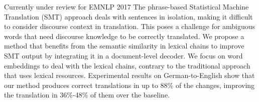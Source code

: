 Currently under review for EMNLP 2017 The phrase-based Statistical Machine Translation (SMT) approach deals with sentences in isolation, making it difficult to consider discourse context in translation. This poses a challenge for ambiguous words that need discourse knowledge to be correctly translated. We propose a method that benefits from the semantic similarity in lexical chains to improve SMT output by integrating it in a document-level decoder. We focus on word embeddings to deal with the lexical chains, contrary to the traditional approach that uses lexical resources. Experimental results on German-to-English show that our method produces correct translations in up to 88\% of the changes, improving the translation in 36\%-48\% of them over the baseline.
